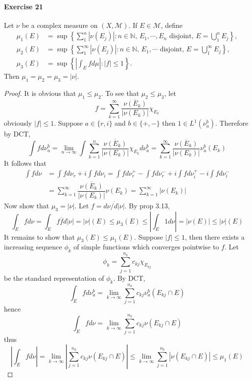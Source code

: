 \paragraph*{Exercise 21}
Let $\nu$ be a complex measure on $(X,\mathcal{M})$. If $E\in\mathcal{M}$, define
\begin{align*}
    \mu_1(E)&=\sup\left\{\sum^n_1|\nu(E_j)|:\text{$n\in\mathbb{N}$, $E_1,\cdots,E_n$ disjoint, $E=\bigcup^n_1E_j$}\right\},\\
    \mu_2(E)&=\sup\left\{\sum^\infty_1|\nu(E_j)|:\text{$n\in\mathbb{N}$, $E_1,\cdots$ disjoint, $E=\bigcup^\infty_1E_j$}\right\},\\
    \mu_3(E)&=\sup\left\{\left|\int_Efd\mu\right|:|f|\le 1\right\}.
\end{align*}
Then $\mu_1=\mu_2=\mu_3=|\nu|$.
\begin{proof}
    It is obvious that $\mu_1\le\mu_2$. To see that $\mu_2\le\mu_3$, let
    $$
    f=\sum^\infty_{k=1}\dfrac{\overline{\nu(E_k)}}{|\nu(E_k)|}\chi_{E_k}
    $$
    obviously $|f|\le 1$. Suppose $a\in\{r,i\}$ and $b\in\{+,-\}$ then $1\in L^1(\nu^b_a)$. Therefore by DCT,
    $$
    \int fd\nu^b_a=\lim_{n\to\infty}\int\sum^n_{k=1}\dfrac{\overline{\nu(E_k)}}{|\nu(E_k)|}\chi_{E_k}d\nu^b_a=\sum^\infty_{k=1}\dfrac{\overline{\nu(E_k)}}{|\nu(E_k)|}\nu^b_a(E_k)
    $$
    It follows that
    \begin{align*}
        \int fd\nu&=\int fd\nu_r+i\int fd\nu_i=\int fd\nu_r^+-\int fd\nu_r^-+i\int fd\nu^+_i-i\int fd\nu^-_i\\
        &=\sum^\infty_{k=1}\dfrac{\overline{\nu(E_k)}}{|\nu(E_k)|}\nu(E_k)=\sum^\infty_{k=1}|\nu(E_k)|
    \end{align*}
    Now show that $\mu_3=|\nu|$. Let $f=\overline{d\nu/d|\nu|}$. By prop 3.13,
    $$
    \int_E fd\nu=\int_E f\overline{f}d|\nu|=|\nu|(E)\le\mu_3(E)\le\left|\int_E 1d\nu\right|=|\nu(E)|\le|\nu|(E)
    $$
    It remains to show that $\mu_3(E)\le\mu_1(E)$. Suppose $|f|\le 1$, then there exists a increasing sequence $\phi_k$ of simple functions which converges pointwise to $f$. Let
    $$
    \phi_k=\sum^{n_k}_{j=1}c_{kj}\chi_{E_{kj}}
    $$
    be the standard representation of $\phi_k$. By DCT,
    $$
    \int_Efd\nu^b_a=\lim_{k\to\infty}\sum^{n_k}_{j=1}c_{kj}\nu^b_a(E_{kj}\cap E)
    $$
    hence
    $$
    \int_Efd\nu=\lim_{k\to\infty}\sum^{n_k}_{j=1}c_{kj}\nu(E_{kj}\cap E)
    $$
    thus
    $$
    \left|\int_Efd\nu\right|=\lim_{k\to\infty}\left|\sum^{n_k}_{j=1}c_{kj}\nu(E_{kj}\cap E)\right|\le\lim_{k\to\infty}\sum^{n_k}_{j=1}|\nu(E_{kj}\cap E)|\le\mu_1(E)
    $$
\end{proof}
